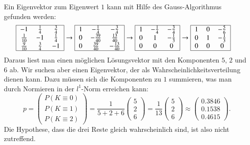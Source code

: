 Ein Eigenvektor zum Eigenwert $1$ kann mit Hilfe des Gauss-Algorithmus
%
gefunden werden:
\begin{align*}
\begin{tabular}{|>{$}c<{$}>{$}c<{$}>{$}c<{$}|}
\hline
-1         &\frac14 &\frac34 \\
\frac1{10} &-1      &\frac14 \\
\frac9{10} &\frac34 &-1      \\
\hline
\end{tabular}
&\rightarrow
\begin{tabular}{|>{$}c<{$}>{$}c<{$}>{$}c<{$}|}
\hline
1          &-\frac14       &-\frac34       \\
0          &-\frac{39}{40} & \frac{13}{40} \\
0          & \frac{39}{40} &-\frac{13}{40} \\
\hline
\end{tabular}
\rightarrow
\begin{tabular}{|>{$}c<{$}>{$}c<{$}>{$}c<{$}|}
\hline
1 &-\frac14 &-\frac34 \\
0 & 1       &-\frac13 \\
0 & 0       & 0       \\
\hline
\end{tabular}
\rightarrow
\begin{tabular}{|>{$}c<{$}>{$}c<{$}>{$}c<{$}|}
\hline
1 & 0 &-\frac56 \\
0 & 1 &-\frac13 \\
0 & 0 & 0       \\
\hline
\end{tabular}
\end{align*}
Daraus liest man einen möglichen Lösungsvektor mit den Komponenten
$5$, $2$ und $6$ ab.
Wir suchen aber einen Eigenvektor, der als Wahrscheinlichkeitsverteilung
dienen kann.
Dazu müssen sich die Komponenten zu $1$ summieren, was man durch Normieren
in der $l^1$-Norm erreichen kann:
\begin{equation}
p
=
\begin{pmatrix}
P(K\equiv 0)\\
P(K\equiv 1)\\
P(K\equiv 2)
\end{pmatrix}
=
\frac{1}{5+2+6}
\begin{pmatrix}
5\\2\\6
\end{pmatrix}
=
\frac{1}{13}
\begin{pmatrix}
5\\2\\6
\end{pmatrix}
\approx
\begin{pmatrix}
   0.3846 \\
   0.1538 \\
   0.4615
\end{pmatrix}.
\label{buch:wahrscheinlichkeit:spielBP}
\end{equation}
Die Hypothese, dass die drei Reste gleich wahrscheinlich sind, ist
also nicht zutreffend.

